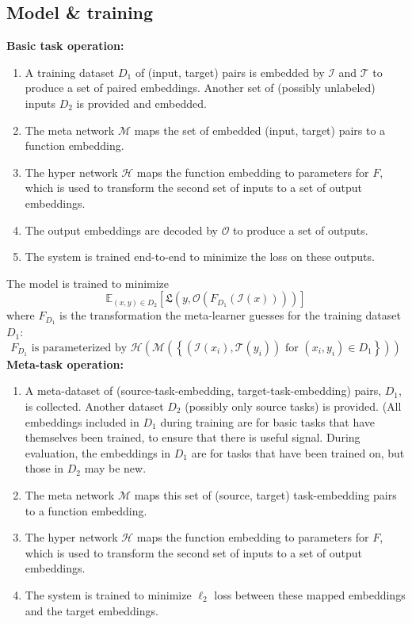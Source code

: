 \subsection{Model \& training} \label{app_model_details}
\textbf{Basic task operation:}
\begin{enumerate}
\item A training dataset $D_1$ of (input, target) pairs is embedded by $\mathcal{I}$ and $\mathcal{T}$ to produce a set of paired embeddings. Another set of (possibly unlabeled) inputs $D_2$ is provided and embedded.
\item The meta network $\mathcal{M}$ maps the set of embedded (input, target) pairs to a function embedding.
\item The hyper network $\mathcal{H}$ maps the function embedding to parameters for $F$, which is used to transform the second set of inputs to a set of output embeddings.
\item The output embeddings are decoded by $\mathcal{O}$ to produce a set of outputs.
\item The system is trained end-to-end to minimize the loss on these outputs.
\end{enumerate}
The model is trained to minimize 
\[\mathbb{E}_{(x, y)\in {D}_2} \left[ \mathfrak{L}\left(y, \mathcal{O}\left(F_{D_1}\left(\mathcal{I} \left(x\right)\right) \right)\right)\right]\]
where $F_{D_1}$ is the transformation the meta-learner guesses for the training dataset $D_1$:
\[F_{D_1} \text{ is parameterized by } \mathcal{H}\left(\mathcal{M}\left( \left\{\left(\mathcal{I}\left(x_i\right), \mathcal{T}\left(y_i\right) \right) \text{ for } (x_i, y_i) \in D_1 \right\}\right)\right)\]
\textbf{Meta-task operation:}
\begin{enumerate}
\item A meta-dataset of (source-task-embedding, target-task-embedding) pairs, $D_1$, is collected. Another dataset $D_2$ (possibly only source tasks) is provided. (All embeddings included in $D_1$ during training are for basic tasks that have themselves been trained, to ensure that there is useful signal. During evaluation, the embeddings in $D_1$ are for tasks that have been trained on, but those in $D_2$ may be new.
\item The meta network $\mathcal{M}$ maps this set of (source, target) task-embedding pairs to a function embedding.
\item The hyper network $\mathcal{H}$ maps the function embedding to parameters for $F$, which is used to transform the second set of inputs to a set of output embeddings.
\item The system is trained to minimize $\ell_2$ loss between these mapped embeddings and the target embeddings.  
\end{enumerate}
